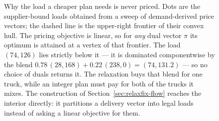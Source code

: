 \begin{figure}[!ht]
\caption{Why the load a cheaper plan needs is never priced. Dots are
the supplier-bound loads obtained from a sweep of demand-derived price
vectors; the dashed line is the upper-right frontier of their convex
hull. The pricing objective is linear, so for \emph{any} dual vector
$\pi$ its optimum is attained at a vertex of that frontier. The load
$(74,126)$ lies strictly below it --- it is dominated componentwise by
the blend $0.78\,(28,168)+0.22\,(238,0)=(74,131.2)$ --- so no choice of
duals returns it. The relaxation buys that blend for one truck, while
an integer plan must pay for both of the trucks it mixes. The construction of
Section~\ref{sec:relaxfix-flow} reaches the interior directly: it
partitions a delivery vector into legal loads instead of asking a
linear objective for them.}
\label{fig:hull}
\end{figure}
